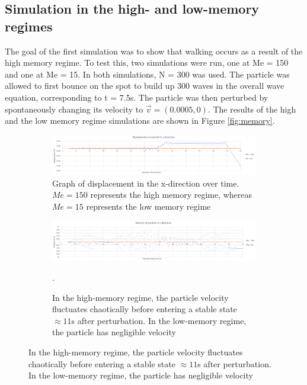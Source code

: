 \subsection{Simulation in the high- and low-memory regimes}

The goal of the first simulation was to show that walking occurs as a result of the high memory regime. To test this, two simulations were run, one at Me = 150 and one at Me = 15. In both simulations, N = 300 was used. The particle was allowed to first bounce on the spot to build up 300 waves in the overall wave equation, corresponding to t = 7.5s. The particle was then perturbed by spontaneously changing its velocity to $\vec{v} = (0.0005,0)$. The results of the high and the low memory regime simulations are shown in Figure \ref{fig:memory}. 

\begin{figure}
	\centering
	\begin{subfigure}{\textwidth}
		\includegraphics[width=\textwidth]{simulation/highmemory/displacement.png}
		\caption{Graph of displacement in the x-direction over time. $Me=150$ represents the high memory regime, whereas $Me=15$ represents the low memory regime}
		\label{fig:mem:displacement}
	\end{subfigure}
	
	\begin{subfigure}{\textwidth}
		\includegraphics[width=\textwidth]{simulation/highmemory/velocity.png}
		\caption{In the high-memory regime, the particle velocity fluctuates chaotically before entering a stable state $\approx 11$s after perturbation. In the low-memory regime, the particle has negligible velocity}
		\label{fig:mem:velocity}.
	\end{subfigure}
	

\end{figure}
